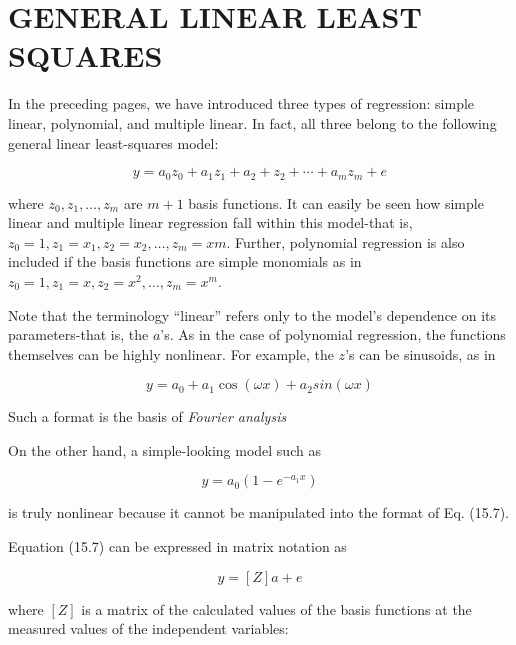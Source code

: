 \documentclass[../main.tex]{subfiles}
\begin{document}
\label{cha:cha_P_15_3} %
\section{GENERAL LINEAR LEAST SQUARES}

\noindent In the preceding pages, we have introduced three types of regression: simple linear, polynomial, and multiple linear. In fact, all three belong to the following general linear least-squares model:

\begin{equation}
	\tag{15.7}
	y = a_0 z_0 + a_1 z_1 + a_2 + z_2 + \cdots + a_m z_m + e
\end{equation}

\noindent where $z_0, z_1, \ldots, z_m$ are $m + 1$ basis functions. It can easily be seen how simple linear and multiple linear regression fall within this model-that is, $z_0 = 1, z_1 = x_1, z_2 = x_2, \ldots, z_m = xm$. Further, polynomial regression is also included if the basis functions are simple monomials as in $z_0 = 1, z_1 = x, z_2 = x^2, \ldots, z_m = x^m$.

Note that the terminology ``linear'' refers only to the model's dependence on its
parameters-that is, the $a$'s. As in the case of polynomial regression, the functions themselves can be highly nonlinear. For example, the $z$'s can be sinusoids, as in

\begin{equation}
	y = a_0 + a_1 \cos (\omega x) + a_2 sin (\omega x)
\end{equation}

\noindent Such a format is the basis of \textit{Fourier analysis}

On the other hand, a simple-looking model such as

\begin{equation}
	y = a_0 (1- e^{-a_1 x})
\end{equation}

\noindent is truly nonlinear because it cannot be manipulated into the format of Eq. (15.7).

Equation (15.7) can be expressed in matrix notation as

\begin{equation}
	\tag{15.8}
	{y} = [Z] {a} + {e}
\end{equation}

\noindent where $[Z]$ is a matrix of the calculated values of the basis functions at the measured values of the independent variables:
\end{document}
